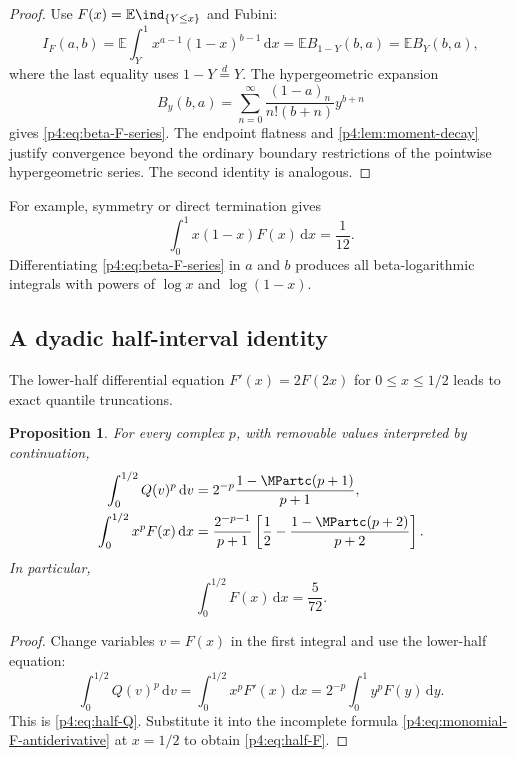 \documentclass[11pt,oneside]{article}
\newtheorem{proposition}[theorem]{Proposition}
\theoremstyle{definition}
\theoremstyle{remark}
\newcommand{\F}{F}
\newcommand{\Q}{Q}
\newcommand{\E}{\mathbb E}
\newcommand{\dd}{\,\mathrm d}
\newcommand{\1}{\mathbf 1}
\begin{document}
\begin{proof}
Use \(\F(x)=\E\ind_{\{Y\le x\}}\) and Fubini:
\[
 I_F(a,b)=\E\int_Y^1x^{a-1}(1-x)^{b-1}\dd x
 =\E B_{1-Y}(b,a)=\E B_Y(b,a),
\]
where the last equality uses \(1-Y\overset d=Y\).  The hypergeometric expansion
\[
 B_y(b,a)=\sum_{n=0}^{\infty}
 \frac{(1-a)_n}{n!(b+n)}y^{b+n}
\]
gives \cref{p4:eq:beta-F-series}.  The endpoint flatness and
\cref{p4:lem:moment-decay} justify convergence beyond the ordinary boundary restrictions
of the pointwise hypergeometric series.  The second identity is analogous.
\end{proof}

For example, symmetry or direct termination gives
\begin{equation}\label{p4:eq:beta-example}
 \int_0^1x(1-x)\F(x)\dd x=\frac1{12}.
\end{equation}
Differentiating \cref{p4:eq:beta-F-series} in \(a\) and \(b\) produces all beta-logarithmic
integrals with powers of \(\log x\) and \(\log(1-x)\).

\subsection{A dyadic half-interval identity}

The lower-half differential equation \(\F'(x)=2\F(2x)\) for \(0\le x\le1/2\)
leads to exact quantile truncations.

\begin{proposition}\label{p4:prop:half-identities}
For every complex \(p\), with removable values interpreted by continuation,
\begin{align}
 \int_0^{1/2}\Q(v)^p\dd v
 &=2^{-p}\frac{1-\MPartc(p+1)}{p+1},
 \label{p4:eq:half-Q}\\
 \int_0^{1/2}x^p\F(x)\dd x
 &=\frac{2^{-p-1}}{p+1}
 \left[\frac12-\frac{1-\MPartc(p+2)}{p+2}\right].
 \label{p4:eq:half-F}
\end{align}
In particular,
\begin{equation}\label{p4:eq:half-F-zero}
 \int_0^{1/2}\F(x)\dd x=\frac5{72}.
\end{equation}
\end{proposition}

\begin{proof}
Change variables \(v=\F(x)\) in the first integral and use the lower-half equation:
\[
 \int_0^{1/2}\Q(v)^p\dd v
 =\int_0^{1/2}x^p\F'(x)\dd x
 =2^{-p}\int_0^1y^p\F(y)\dd y.
\]
This is \cref{p4:eq:half-Q}.  Substitute it into the incomplete formula
\cref{p4:eq:monomial-F-antiderivative} at \(x=1/2\) to obtain \cref{p4:eq:half-F}.
\end{proof}
\end{document}
